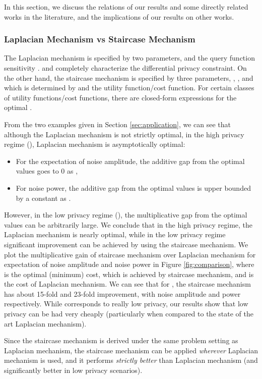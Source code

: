 In this section, we discuss the relations of our results and some directly related works in the literature, and the implications of our results on  other works.

\subsubsection{Laplacian Mechanism vs Staircase Mechanism}



The Laplacian mechanism is specified by two parameters,  and the query function sensitivity .  and  completely characterize the  differential privacy constraint. On the other hand, the staircase mechanism is specified by three parameters, , , and  which is determined by  and the utility function/cost function. For certain classes of utility functions/cost  functions, there are closed-form expressions for the optimal .

From the two examples given in Section \ref{sec:application}, we can see that although the Laplacian mechanism is not strictly optimal, in the high privacy regime (), Laplacian mechanism is asymptotically optimal:
\begin{itemize}
	\item For the expectation of noise amplitude, the additive gap from the optimal values goes to 0 as ,
	\item For noise power, the additive gap from the optimal values is upper bounded by a constant  as .
\end{itemize}
 However, in the low privacy regime (), the multiplicative gap from the optimal values can be arbitrarily large. We conclude that in the high privacy regime, the Laplacian mechanism is nearly optimal, while in the low privacy regime significant improvement can be achieved by using the staircase mechanism. We plot the multiplicative gain of staircase mechanism over Laplacian mechanism for expectation of noise amplitude and noise power in Figure  \ref{fig:comparison}, where  is the optimal (minimum) cost, which is achieved by staircase mechanism, and  is the cost of Laplacian mechanism. We can see that for , the staircase mechanism has about 15-fold and 23-fold improvement, with noise amplitude and power respectively. While  corresponds to really low privacy, our results show that low privacy can be had very cheaply (particularly when compared to the state of the art Laplacian mechanism).


Since the staircase mechanism is derived under the same problem setting as Laplacian mechanism, the staircase mechanism can be applied {\em wherever} Laplacian mechanism is used, and it performs {\em strictly better} than Laplacian mechanism (and significantly better in low privacy scenarios).



